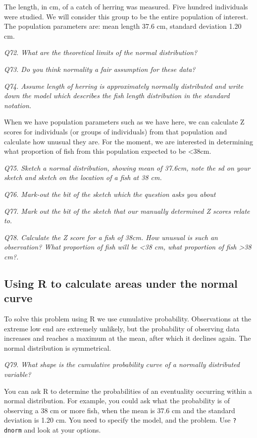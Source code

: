 \documentclass[
  11pt,
  a4paper,
]{book}
\begin{document}
The length, in cm, of a catch of herring was measured. Five hundred individuals were studied. We will consider this group to be the entire population of interest. The population parameters are: mean length 37.6 cm, standard deviation 1.20 cm.

\emph{Q72. What are the theoretical limits of the normal distribution?}

\emph{Q73. Do you think normality a fair assumption for these data?}

\emph{Q74. Assume length of herring is approximately normally distributed and write down the model which describes the fish length distribution in the standard notation.}

When we have population parameters such as we have here, we can calculate Z scores for individuals (or groups of individuals) from that population and calculate how unusual they are. For the moment, we are interested in determining what proportion of fish from this population expected to be \textless38cm.

\emph{Q75. Sketch a normal distribution, showing mean of 37.6cm, note the sd on your sketch and sketch on the location of a fish at 38 cm.}

\emph{Q76. Mark-out the bit of the sketch which the question asks you about}

\emph{Q77. Mark out the bit of the sketch that our manually determined Z scores relate to.}

\emph{Q78. Calculate the Z score for a fish of 38cm. How unusual is such an observation? What proportion of fish will be \textless38 cm, what proportion of fish \textgreater38 cm?.}

\hypertarget{using-r-to-calculate-areas-under-the-normal-curve}{%
\subsection{Using R to calculate areas under the normal curve}\label{using-r-to-calculate-areas-under-the-normal-curve}}

To solve this problem using R we use cumulative probability. Observations at the extreme low end are extremely unlikely, but the probability of observing data increases and reaches a maximum at the mean, after which it declines again. The normal distribution is symmetrical.

\emph{Q79. What shape is the cumulative probability curve of a normally distributed variable?}

You can ask R to determine the probabilities of an eventuality occurring within a normal distribution. For example, you could ask what the probability is of observing a 38 cm or more fish, when the mean is 37.6 cm and the standard deviation is 1.20 cm. You need to specify the model, and the problem. Use \texttt{?dnorm} and look at your options.
\end{document}
